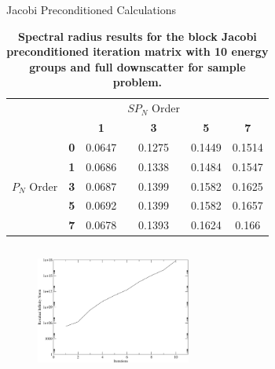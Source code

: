 \documentclass{beamer}
\begin{document}
\begin{frame}{Jacobi Preconditioned Calculations}

{\tiny  \begin{table}[h!]
    \begin{center}
      \begin{tabular}{cccccc}\hline\hline
        \multicolumn{1}{c}{}& 
        \multicolumn{1}{c}{}& 
        \multicolumn{1}{c}{}& 
        \multicolumn{1}{c}{$SP_N$ Order}& 
        \multicolumn{1}{c}{}& 
        \multicolumn{1}{c}{} \\
        &   & \textbf{1} & \textbf{3} & \textbf{5} & \textbf{7}  \\
        & \textbf{0} & 0.0647 & 0.1275 & 0.1449 & 0.1514 \\
        & \textbf{1} & 0.0686 & 0.1338 & 0.1484 & 0.1547 \\
        $P_N$ Order & \textbf{3} & 0.0687 & 0.1399 & 0.1582 & 0.1625 \\
        & \textbf{5} & 0.0692 & 0.1399 & 0.1582 & 0.1657 \\
        & \textbf{7} & 0.0678 & 0.1393 & 0.1624 & 0.166 \\
        \hline\hline
      \end{tabular}
    \end{center}
    \caption{\textbf{Spectral radius results for the block Jacobi
        preconditioned iteration matrix with 10 energy groups and full
        downscatter for sample problem.}}
    \label{tab:group10dsbj}
  \end{table}
}

  \begin{columns}

    \begin{column}{0.5\textwidth}

      \begin{figure}[t!]
        \begin{center}
          \includegraphics[width=2.0in]{block_jacobi_res.pdf}
        \end{center}
      \end{figure}


\end{column}
\end{columns}
\end{frame}
\end{document}

